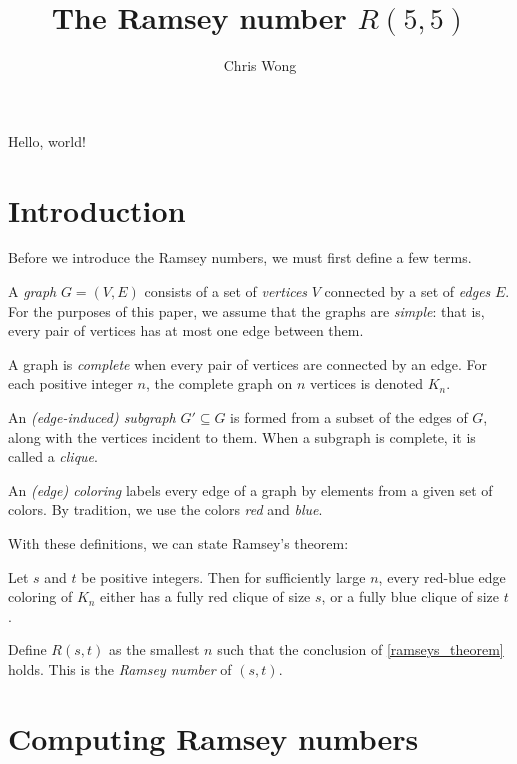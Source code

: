 \documentclass{article}
\begin{document}
\author{Chris Wong}
\title{The Ramsey number $R(5,5)$}
\maketitle

Hello, world!

\section{Introduction}

Before we introduce the Ramsey numbers, we must first define a few terms.

A \textit{graph} $G = (V, E)$ consists of a set of \textit{vertices} $V$ connected by a set of \textit{edges} $E$. For the purposes of this paper, we assume that the graphs are \textit{simple}: that is, every pair of vertices has at most one edge between them.

A graph is \textit{complete} when every pair of vertices are connected by an edge. For each positive integer $n$, the complete graph on $n$ vertices is denoted $K_n$.

An \textit{(edge-induced) subgraph} $G' \subseteq G$ is formed from a subset of the edges of $G$, along with the vertices incident to them. When a subgraph is complete, it is called a \textit{clique}.

An \textit{(edge) coloring} labels every edge of a graph by elements from a given set of colors. By tradition, we use the colors \textit{red} and \textit{blue}.

With these definitions, we can state Ramsey's theorem:

\begin{Theorem} \label{ramseys_theorem}
    Let $s$ and $t$ be positive integers. Then for sufficiently large $n$, every red-blue edge coloring of $K_n$ either has a fully red clique of size $s$, or a fully blue clique of size $t$.
\end{Theorem}

\begin{Definition}
    Define $R(s,t)$ as the smallest $n$ such that the conclusion of \cref{ramseys_theorem} holds. This is the \textit{Ramsey number} of $(s,t)$.
\end{Definition}

\section{Computing Ramsey numbers}
\end{document}
